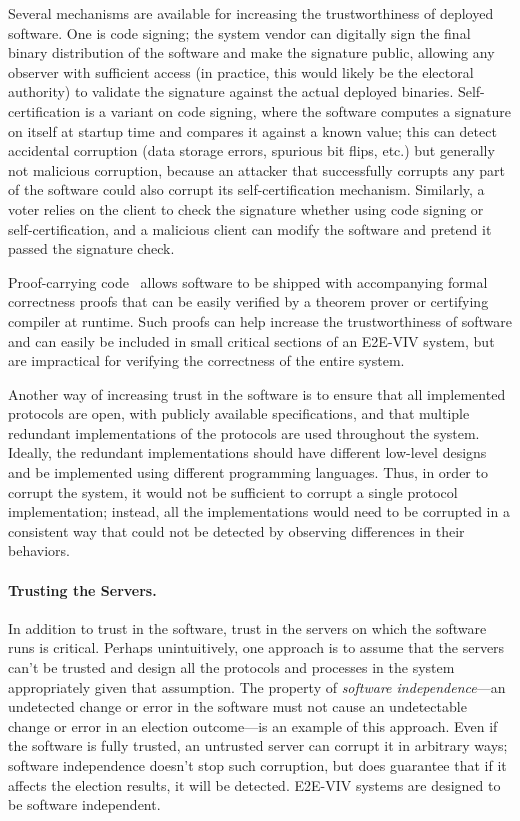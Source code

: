 Several mechanisms are available for increasing the trustworthiness of
deployed software. One is code signing; the system vendor can
digitally sign the final binary distribution of the software and make
the signature public, allowing any observer with sufficient access (in
practice, this would likely be the electoral authority) to validate
the signature against the actual deployed binaries. Self-certification
is a variant on code signing, where the software computes a signature
on itself at startup time and compares it against a known value; this
can detect accidental corruption (data storage errors, spurious bit
flips, etc.) but generally not malicious corruption, because an
attacker that successfully corrupts any part of the software could
also corrupt its self-certification mechanism. Similarly, a voter
relies on the client to check the signature whether using code signing
or self-certification, and a malicious client can modify the software
and pretend it passed the signature check.

Proof-carrying code~\cite{Necula02} allows software to be shipped with
accompanying formal correctness proofs that can be easily verified by
a theorem prover or certifying compiler at runtime. Such proofs can
help increase the trustworthiness of software and can easily be
included in small critical sections of an E2E-VIV system, but are
impractical for verifying the correctness of the entire system.

Another way of increasing trust in the software is to ensure that all
implemented protocols are open, with publicly available
specifications, and that multiple redundant implementations of the
protocols are used throughout the system. Ideally, the redundant
implementations should have different low-level designs and be
implemented using different programming languages. Thus, in order to
corrupt the system, it would not be sufficient to corrupt a single
protocol implementation; instead, all the implementations would need
to be corrupted in a consistent way that could not be detected by
observing differences in their behaviors.

\paragraph{Trusting the Servers.} In addition to trust in the
software, trust in the servers on which the software runs is
critical. Perhaps unintuitively, one approach is to assume that the
servers can't be trusted and design all the protocols and processes in
the system appropriately given that assumption. The property of
\emph{software independence}---an undetected change or error in the
software must not cause an undetectable change or error in an election
outcome---is an example of this approach. Even if the software is
fully trusted, an untrusted server can corrupt it in arbitrary ways;
software independence doesn't stop such corruption, but does guarantee
that if it affects the election results, it will be detected.  E2E-VIV
systems are designed to be software independent.

